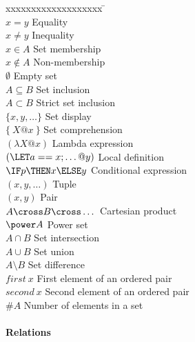 \begin{tabbing}
xxxxxxxxxxxxxxxxxxx \= \kill \\ 
$x = y$ \> Equality \\
$x \neq y$ \> Inequality \\
$x \in A$ \> Set membership \\
$x \notin A$ \> Non-membership \\
$\emptyset$ \> Empty set \\
$A \subseteq B$ \> Set inclusion \\
$A \subset B$ \> Strict set inclusion \\
$\{ x, y, \dots \}$ \> Set display \\
$\{~ X @ x ~\}$ \> Set comprehension \\
$(\lambda X @ x)$ \> Lambda expression \\
$(\LET a == x; \dots @ y)$ \> Local definition \\
$\IF p \THEN x \ELSE y$ \> Conditional expression \\
$(x,y, \dots)$ \> Tuple \\
$(x,y)$ \> Pair \\
$A \cross B \cross \dots$ \> Cartesian product \\
$\power A$ \> Power set \\
$A \cap B$ \> Set intersection \\
$A \cup B$ \> Set union \\
$A \setminus B$ \> Set difference \\
$first~x$ \> First element of an ordered pair \\
$second~x$ \> Second element of an ordered pair \\
$\# A$ \> Number of elements in a set \\
\end{tabbing}

\paragraph{Relations}

